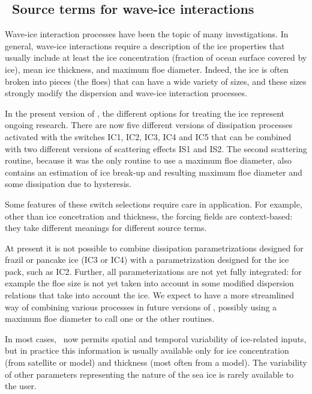 \vssub
\subsection{~Source terms for wave-ice interactions}
\vsssub


Wave-ice interaction processes have been the topic of many investigations. In general, wave-ice interactions require 
a description of the ice properties that usually include at least the ice concentration (fraction of ocean surface covered by ice), 
mean ice thickness, and maximum floe diameter. Indeed, the ice is often broken into pieces (the floes) that can have a wide variety of sizes, 
and these sizes strongly modify the dispersion and wave-ice interaction processes. 

In the present version of \ww, the different options 
for treating the ice represent ongoing research. There are now five different 
versions of dissipation processes activated with the switches {\code IC1}, {\code IC2},  {\code IC3}, {\code IC4} and {\code IC5} that can be combined with two 
different versions of scattering effects  {\code IS1} and {\code IS2}. The second scattering routine, because it was the only routine 
to use a maximum floe diameter, also contains an estimation of 
ice break-up and resulting maximum floe diameter and some dissipation due to hysteresis. 

Some features of these switch selections require care in application. For example, other than ice concetration and thickness, the forcing fields are context-based: they take different meanings for different source terms.

At present it is not possible to combine dissipation parametrizations designed for frazil or pancake ice ({\code IC3} or {\code IC4}) with a parametrization designed for the ice pack, such as {\code IC2}. Further, all parameterizations are not yet fully integrated: for example the floe size is not yet taken into account in some modified dispersion relations that take into account the ice. We expect to have a more streamlined way of combining various processes in future versions of \ws, possibly using a maximum floe diameter to call one or the other routines. 

In most cases, \ws\ now permits spatial and temporal variability of ice-related inputs, but in practice this information is usually available only for ice concentration (from satellite or model) and thickness (most often from a model). The variability of other parameters representing the nature of the sea ice is rarely available to the user. 


